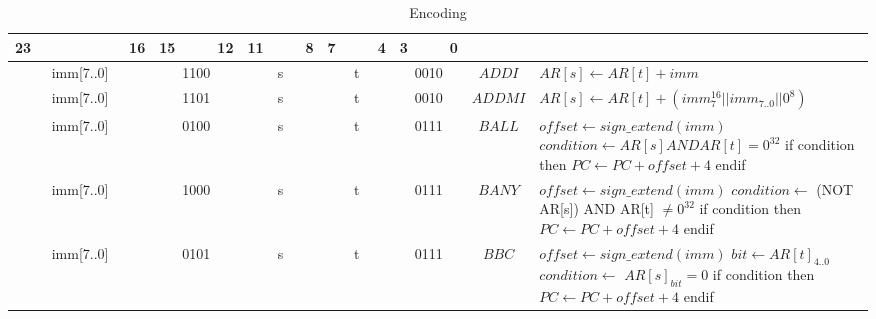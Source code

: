 \setlength{\tabcolsep}{4pt}
\renewcommand{\arraystretch}{2}
	\begin{longtable}{llllllllllllllllllllllll  p{1cm}  p{7cm} | }
		\caption{Encoding\label{long}}\\
		23 & & & & & & & 16 & 15 & & & 12 & 11 & & & 8 & 7 & & & 4 & 3 & & & 0 & & \multicolumn{1}{c}{}\\
		\hline
        \endhead
		\multicolumn{8}{|c|}{imm[7..0]} & \multicolumn{4}{c|}{1100} & \multicolumn{4}{c|}{s} & \multicolumn{4}{c|}{t} & \multicolumn{4}{c|}{0010} & \multicolumn{1}{c|}{$ADDI$} & $AR[s] \leftarrow AR[t] + imm$ \\ \hline
		\multicolumn{8}{|c|}{imm[7..0]} & \multicolumn{4}{c|}{1101} & \multicolumn{4}{c|}{s} & \multicolumn{4}{c|}{t} & \multicolumn{4}{c|}{0010} & \multicolumn{1}{c|}{$ADDMI$} & $AR[s] \leftarrow AR[t] + (imm_7^{16} || imm_{7..0} || 0^8)$ \\ \hline
		\multicolumn{8}{|c|}{imm[7..0]} & \multicolumn{4}{c|}{0100} & \multicolumn{4}{c|}{s} & \multicolumn{4}{c|}{t} & \multicolumn{4}{c|}{0111} & \multicolumn{1}{c|}{$BALL$} & $offset \leftarrow sign\_extend(imm)$ \newline $condition \leftarrow AR[s] AND AR[t] = 0^{32}$ \newline if condition then \newline $PC \leftarrow PC + offset + 4$ \newline endif\\ \hline
		\multicolumn{8}{|c|}{imm[7..0]} & \multicolumn{4}{c|}{1000} & \multicolumn{4}{c|}{s} & \multicolumn{4}{c|}{t} & \multicolumn{4}{c|}{0111} & \multicolumn{1}{c|}{$BANY$} & $offset \leftarrow sign\_extend(imm)$ \newline  $condition \leftarrow$ (NOT AR[s]) AND AR[t] $\neq 0^{32}$ \newline if condition then \newline $PC \leftarrow PC + offset + 4$ \newline endif\\ \hline
		\multicolumn{8}{|c|}{imm[7..0]} & \multicolumn{4}{c|}{0101} & \multicolumn{4}{c|}{s} & \multicolumn{4}{c|}{t} & \multicolumn{4}{c|}{0111} & \multicolumn{1}{c|}{$BBC$} & $offset \leftarrow sign\_extend(imm)$ \newline $bit \leftarrow AR[t]_{4..0}$ \newline $condition \leftarrow$ $AR[s]_{bit} = 0$ \newline if condition then \newline $PC \leftarrow PC + offset + 4$ \newline endif\\ \hline

\end{longtable}
